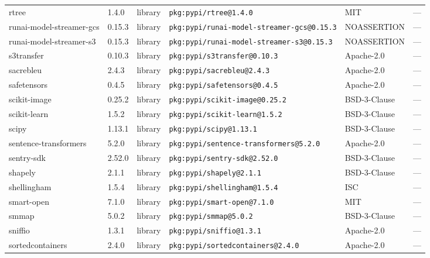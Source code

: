 \documentclass[11pt,a4paper]{article}
\begin{document}
\begin{longtable}{|p{4cm}|p{2cm}|p{1.6cm}|p{5cm}|p{1.5cm}|p{3.5cm}|}
\raggedright rtree & 1.4.0 & library & \small\texttt{pkg:pypi/rtree@1.4.0} & MIT & \small — \\
\raggedright runai-model-streamer-gcs & 0.15.3 & library & \small\texttt{pkg:pypi/runai-model-streamer-gcs@0.15.3} & NOASSERTION & \small — \\
\raggedright runai-model-streamer-s3 & 0.15.3 & library & \small\texttt{pkg:pypi/runai-model-streamer-s3@0.15.3} & NOASSERTION & \small — \\
\raggedright s3transfer & 0.10.3 & library & \small\texttt{pkg:pypi/s3transfer@0.10.3} & Apache-2.0 & \small — \\
\raggedright sacrebleu & 2.4.3 & library & \small\texttt{pkg:pypi/sacrebleu@2.4.3} & Apache-2.0 & \small — \\
\raggedright safetensors & 0.4.5 & library & \small\texttt{pkg:pypi/safetensors@0.4.5} & Apache-2.0 & \small — \\
\raggedright scikit-image & 0.25.2 & library & \small\texttt{pkg:pypi/scikit-image@0.25.2} & BSD-3-Clause & \small — \\
\raggedright scikit-learn & 1.5.2 & library & \small\texttt{pkg:pypi/scikit-learn@1.5.2} & BSD-3-Clause & \small — \\
\raggedright scipy & 1.13.1 & library & \small\texttt{pkg:pypi/scipy@1.13.1} & BSD-3-Clause & \small — \\
\raggedright sentence-transformers & 5.2.0 & library & \small\texttt{pkg:pypi/sentence-transformers@5.2.0} & Apache-2.0 & \small — \\
\raggedright sentry-sdk & 2.52.0 & library & \small\texttt{pkg:pypi/sentry-sdk@2.52.0} & BSD-3-Clause & \small — \\
\raggedright shapely & 2.1.1 & library & \small\texttt{pkg:pypi/shapely@2.1.1} & BSD-3-Clause & \small — \\
\raggedright shellingham & 1.5.4 & library & \small\texttt{pkg:pypi/shellingham@1.5.4} & ISC & \small — \\
\raggedright smart-open & 7.1.0 & library & \small\texttt{pkg:pypi/smart-open@7.1.0} & MIT & \small — \\
\raggedright smmap & 5.0.2 & library & \small\texttt{pkg:pypi/smmap@5.0.2} & BSD-3-Clause & \small — \\
\raggedright sniffio & 1.3.1 & library & \small\texttt{pkg:pypi/sniffio@1.3.1} & Apache-2.0 & \small — \\
\raggedright sortedcontainers & 2.4.0 & library & \small\texttt{pkg:pypi/sortedcontainers@2.4.0} & Apache-2.0 & \small — \\

\end{longtable}
\end{document}
